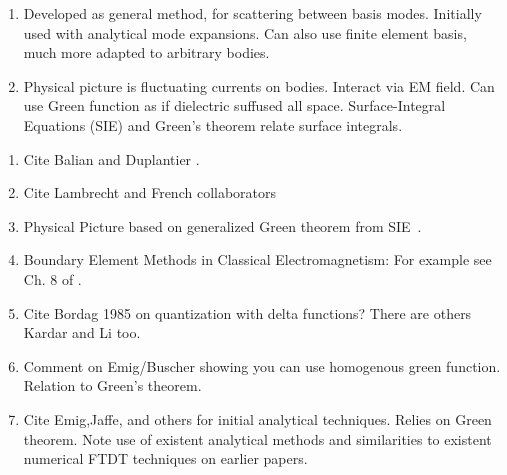 \begin{enumerate}
  \item Developed as general method, for scattering between basis modes.  
    Initially used with analytical mode expansions.  Can also use finite element basis,
    much more adapted to arbitrary bodies.  
\item Physical picture is fluctuating currents on bodies.  Interact via EM field.
  Can use Green function as if dielectric suffused all space.  
Surface-Integral Equations (SIE) and Green's theorem relate surface integrals.  
\end{enumerate}

\begin{enumerate}
\item Cite Balian and Duplantier \cite{Balian1977, Balian1978}.
\item Cite Lambrecht and French collaborators
  \cite{Lambrecht2006, MaiaNeto2008,Canaguier-Durand2012}
\item Physical Picture based on generalized Green theorem from 
  SIE~\cite{Stratton1941}.
  \item Boundary Element Methods in Classical Electromagnetism:
    For example see Ch. 8 of \cite{Chew1995}.  
\item Cite Bordag 1985 on quantization with delta functions?  There are others
Kardar and Li too.  
\item Comment on Emig/Buscher showing you can use homogenous green function.
  Relation to Green's theorem.
\item Cite Emig,Jaffe,  and others for initial analytical techniques.  Relies on Green theorem.
\cite{Emig2004, Emig2007, Rahi2009}
\cite{Kenneth2006}
  Note use of existent analytical methods and similarities to existent 
  numerical FTDT techniques on earlier papers.  
  \cite{Rodriguez2007,Rodriguez2007a, Rodriguez2009}
\end{enumerate}

